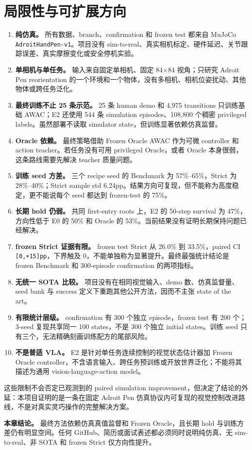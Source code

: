 \hypertarget{ux5c40ux9650ux6027ux4e0eux53efux6269ux5c55ux65b9ux5411}{%
\section{局限性与可扩展方向}\label{ux5c40ux9650ux6027ux4e0eux53efux6269ux5c55ux65b9ux5411}}

\begin{enumerate}
\def\labelenumi{\arabic{enumi}.}
\tightlist
\item
  \textbf{纯仿真。} 所有数据、branch、confirmation 和 frozen test 都来自 MuJoCo \texttt{AdroitHandPen-v1}。项目没有 sim-to-real、真实相机标定、硬件延迟、关节跟踪误差、真实摩擦变化或安全停机实验。
\item
  \textbf{单相机与单任务。} 输入来自固定单相机、固定 84×84 视角；只研究 Adroit Pen reorientation 的一个环境和一个物体，没有多相机、相机位姿扰动、其他物体或跨任务泛化。
\item
  \textbf{最终训练不止 25 条示范。} 25 条 human demo 和 4,975 transitions 只训练基础 AWAC；E2 还使用 544 条 simulation episodes、108,800 个稠密 privileged labels。虽然部署不读取 simulator state，但训练显著依赖仿真监督。
\item
  \textbf{Oracle 依赖。} 最终策略借助 Frozen Oracle AWAC 作为可微 controller 和 action teacher。若任务没有可用 privileged Oracle，或者 Oracle 本身很弱，这条路线需要先解决 teacher 质量问题。
\item
  \textbf{训练 seed 方差。} 三个 recipe seed 的 Benchmark 为 57\%--65\%，Strict 为 28\%--40\%；Strict sample std 6.24pp。结果方向可复现，但不能称为高度稳定，更不能说每个 seed 都达到 frozen-test 的 75\%。
\item
  \textbf{长期 hold 仍弱。} 共同 first-entry roots 上，E2 的 50-step survival 为 47\%，方向性低于 E0 的 50\% 和 Oracle 的 53\%。当前结果没有证明长期保持问题已经解决。
\item
  \textbf{frozen Strict 证据有限。} frozen test Strict 从 26.0\% 到 33.5\%，paired CI \texttt{{[}0,+15{]}pp}，下界触及 0，不能单独称为显著提升。最终最强统计结论是 frozen Benchmark 和 300-episode confirmation 的两项指标。
\item
  \textbf{无统一 SOTA 比较。} 项目没有在相同视觉输入、demo 数、仿真监督量、seed bank 与 success 定义下重跑其他公开方法，因而不主张 state of the art。
\item
  \textbf{有限统计层级。} confirmation 有 300 个独立 episode，frozen test 有 200 个；3-seed 复现共享同一 100 states，不是 300 个独立 initial states。训练 seed 只有三个，无法精确刻画训练配方的尾部风险。
\item
  \textbf{不是普适 VLA。} E2 是针对单任务连续控制的视觉状态估计器加 Frozen Oracle controller，不含语言输入、跨任务预训练或开放世界泛化；不能将其描述为通用 vision-language-action model。
\end{enumerate}

这些限制不会否定已观测到的 paired simulation improvement，但决定了结论的外延：本项目证明的是一条在固定 Adroit Pen 仿真协议内可复现的视觉控制改进路线，不是对真实灵巧操作的完整解决方案。

\textbf{本章结论。} 最终方法依赖仿真真值监督和 Frozen Oracle，且长期 hold 与训练方差仍有明显空间。任何 GitHub、简历或面试表述都必须同时说明纯仿真、无 sim-to-real、非 SOTA 和 frozen Strict 仅方向性提升。
